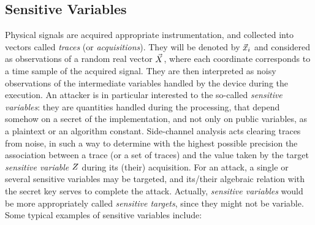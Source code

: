 \subsection{Sensitive Variables}\label{sec:sensitive_variables}
Physical signals are acquired \via appropriate instrumentation, and collected into vectors called \emph{traces} (or \emph{acquisitions}). They will be denoted by $\vec{x}_i$ and considered as observations of a random real vector $\vec{X}$, where each coordinate corresponds to a time sample of the acquired signal.  They are then interpreted as noisy observations of the intermediate variables handled by the device during the execution. An attacker is in particular interested to the so-called \emph{sensitive variables}:  they are quantities handled during the processing, that depend somehow on a secret of the implementation, and not only on public variables, as a plaintext or an algorithm constant. Side-channel analysis acts clearing traces from noise, in such a way to determine with the highest possible precision the association between a trace (or a set of traces) and the value taken by the target \emph{sensitive variable} $Z$ during its (their) acquisition. For an attack, a single or several sensitive variables may be targeted, and its/their algebraic relation with the secret key serves to complete the attack.  Actually, \emph{sensitive variables} would be more appropriately called \emph{sensitive targets}, since they might not be variable. Some typical examples of sensitive variables include: 


